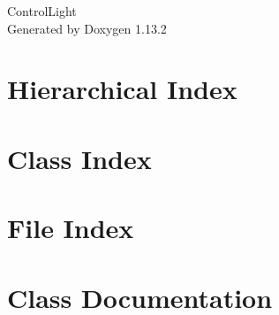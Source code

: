 \documentclass[twoside]{book}
\newcommand{\+}{\discretionary{\mbox{\scriptsize$\hookleftarrow$}}{}{}}
\newcommand{\clearemptydoublepage}{%
    \newpage{\pagestyle{empty}\cleardoublepage}%
  }
\begin{document}
  \raggedbottom
    \hypersetup{pageanchor=false,
                bookmarksnumbered=true,
                pdfencoding=unicode
               }
  \begin{titlepage}
  \vspace*{7cm}
  \begin{center}%
  {\Large Control\+Light}\\
  \vspace*{1cm}
  {\large Generated by Doxygen 1.13.2}\\
  \end{center}
  \end{titlepage}
  \clearemptydoublepage
  \tableofcontents
  \clearemptydoublepage
  \hypersetup{pageanchor=true}

\chapter{Hierarchical Index}

\chapter{Class Index}

\chapter{File Index}

\chapter{Class Documentation}

















\end{document}
